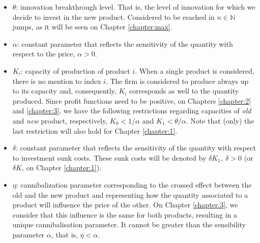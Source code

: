 \begin{itemize}
	\item $\theta$: innovation breakthrough level. That is, the level of innovation for which we decide to invest in the new product. Considered to be reached in $n \in \mathds{N}$ jumps, as it will be seen on Chapter \ref{chapter:max}.
	
	\item $\alpha$: constant parameter that reflects the sensitivity of the quantity with respect to the price, $\alpha>0$.
	
	\item $K_i$: capacity of production of product $i$. When a single product is considered, there is no mention to index $i$. The firm is considered to produce always up to its capacity and, consequently, $K_i$ corresponds as well to the quantity produced. Since profit functions need to be positive, on Chapters \ref{chapter:2} and \ref{chapter:3}, we have the following restrictions regarding capacities of \textit{old} and \textit{new} product, respectively, $K_0<1/\alpha$ and $K_1<\theta/\alpha$. Note that (only) the last restriction will also hold for Chapter \ref{chapter:1}.
	
	\item $\delta$: constant parameter that reflects the sensitivity of the quantity with respect to investment sunk costs. These sunk costs will be denoted by $\delta K_1, \  \delta>0$ (or $\delta K$, on Chapter \ref{chapter:1}).
	
	\item $\eta$: cannibalization parameter corresponding to the crossed effect between the old and the new product and representing how the quantity associated to a product will influence the price of the other. On Chapter \ref{chapter:3}, we consider that this influence is the same for both products, resulting in a unique cannibalisation parameter. It cannot be greater than the sensibility parameter $\alpha$, that is, $\eta <\alpha$.
\end{itemize}